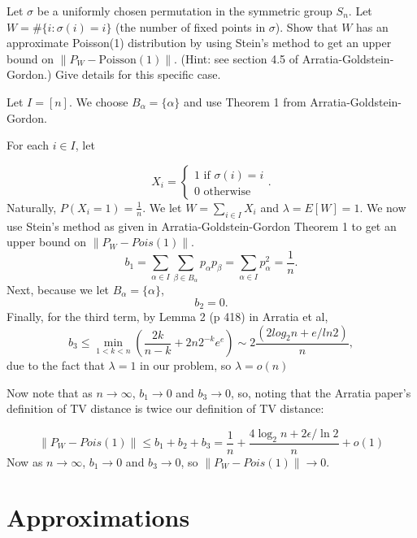\documentclass{article}
\newcommand{\answer}[1]{%
  \begin{tcolorbox}[
    colback=gray!9.8,
    boxrule=0.5pt,
    breakable]
  \small #1
  \end{tcolorbox}}
\begin{document}
\begin{example}
    Let $\sigma$ be a uniformly chosen permutation in the symmetric group $S_n$. Let $W = \#\{i : \sigma(i) = i\}$ (the number of fixed points in $\sigma$). Show that $W$ has an approximate Poisson(1) distribution by using Stein's method to get an upper bound on $\|P_W - \text{Poisson}(1)\|$. (Hint: see section 4.5 of Arratia-Goldstein-Gordon.) Give details for this specific case.

\answer{
Let $I = [n]$. We choose $B_\alpha = \{\alpha\}$ and use Theorem 1 from Arratia-Goldstein-Gordon. 

For each $i\in I$, let

$$X_i = \begin{cases}
    1 \text{ if } \sigma(i) = i\\
    0 \text{ otherwise}
\end{cases}.$$
Naturally, $P(X_i =1) = \frac{1}{n}$. We let $W = \sum_{i\in I} X_i$ and $\lambda = E[W] = 1$. We now use Stein's method as given in Arratia-Goldstein-Gordon Theorem 1 to get an upper bound on $\lVert P_W - Pois(1)\rVert$.
$$b_1 = \sum_{\alpha\in I} \sum_{\beta \in B_\alpha} p_\alpha p_\beta = \sum_{\alpha \in I} p_\alpha^2 = \frac{1}{n}.$$
Next, because we let $B_\alpha = \{\alpha\}$, 
$$b_2 = 0.$$
Finally, for the third term, by Lemma 2 (p 418) in Arratia et al,
$$b_3 \leq \min_{1<k<n} (\frac{2k}{n-k} + 2n 2^{-k} e^{e})\sim 2\frac{(2log_2 n + e/ln 2)}{n},$$
due to the fact that $\lambda=1$ in our problem, so $\lambda = o(n)$

Now note that as $n\to \infty$, $b_1\to 0$ and $b_3\to 0$, so, noting that the Arratia paper's definition of TV distance is twice our definition of TV distance:

$$\lVert P_W - Pois(1)\rVert\leq b_1 + b_2 + b_3 = \frac{1}{n} + \frac{4\log_2 n + 2\epsilon/\ln 2}{n} + o(1)$$
Now as $n\to \infty$, $b_1 \to 0$ and $b_3 \to 0$, so $\lVert P_W - Pois(1)\rVert \to 0$. 
}
\end{example}

\begin{example}
    
\end{example}



\newpage 
\section{Approximations}
\end{document}
